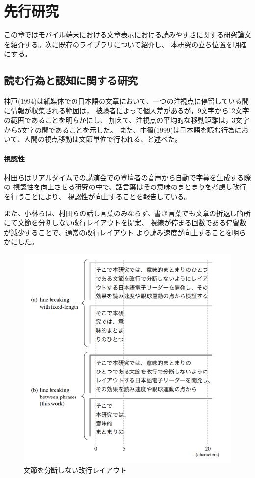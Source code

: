 \chapter{先行研究}
\label{chap:system}

この章ではモバイル端末における文章表示における読みやすさに関する研究論文を紹介する。次に既存のライブラリについて紹介し、
本研究の立ち位置を明確にする。

\newpage

\section{読む行為と認知に関する研究}

神戸(1994)は紙媒体での日本語の文章において、一つの注視点に停留している間に情報が収集される範囲は，
被験者によって個人差があるが，9文字から12文字の範囲であることを明らかにし、
加えて、注視点の平均的な移動距離は，3文字から5文字の間であることを示した。\cite{1}
また、中篠(1999)は日本語を読む行為において、人間の視点移動は文節単位で行われる、と述べた。\cite{2}

\subsubsection{視認性}
村田らはリアルタイムでの講演会での登壇者の音声から自動で字幕を生成する際の
視認性を向上させる研究の中で、話言葉はその意味のまとまりを考慮し改行を行うことにより、
視認性が向上することを報告している。\cite{3}

また、小林らは、村田らの話し言葉のみならず、書き言葉でも文章の折返し箇所にて文節を分断しない改行レイアウトを提案、
視線が停まる回数である停留数が減少することで、通常の改行レイアウト
より読み速度が向上することを明らかにした。 \cite{4}

\begin{figure}[H]
    \centering
    \label{fig:image6}
    \includegraphics[width=0.6\columnwidth]{image/02/img1.png}
    \caption[文節を分断しない改行レイアウト] {文節を分断しない改行レイアウト\footnotemark[1]}
\end{figure}


